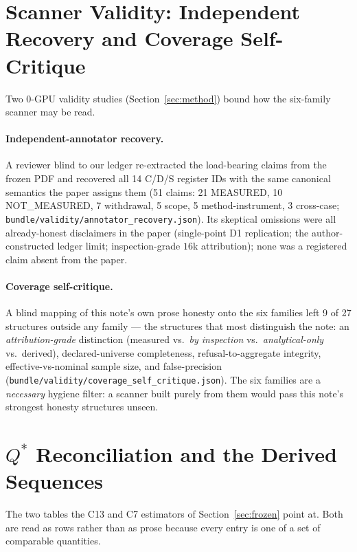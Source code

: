 \documentclass{article}
\newcommand{\zb}{\discretionary{}{}{}}
\newcommand{\code}[1]{\texttt{#1}}
\begin{document}
\section{Scanner Validity: Independent Recovery and Coverage Self-Critique}\label{app:validity}
Two 0-GPU validity studies (Section~\ref{sec:method}) bound how the six-family scanner may be
read.
\paragraph{Independent-annotator recovery.}
A reviewer blind to our ledger re-extracted the load-bearing claims from the frozen PDF and
recovered all 14 C/D/S register IDs with the same canonical semantics the paper assigns them
(51 claims: 21 MEASURED, 10 NOT\_MEASURED, 7 withdrawal, 5 scope, 5 method-instrument, 3
cross-case; \code{bundle/validity/\zb annotator\_recovery.json}). Its skeptical omissions
were all already-honest disclaimers in the paper (single-point D1 replication; the
author-constructed ledger limit; inspection-grade $16$k attribution); none was a registered
claim absent from the paper.
\paragraph{Coverage self-critique.}
A blind mapping of this note's own prose honesty onto the six families left 9 of 27 structures
outside any family --- the structures that most distinguish the note: an
\emph{attribution-grade} distinction (measured vs.\ \emph{by inspection} vs.\
\emph{analytical-only} vs.\ derived), declared-universe completeness, refusal-to-aggregate
integrity, effective-vs-nominal sample size, and false-precision
(\code{bundle/validity/\zb coverage\_self\_critique.json}). The six families are a
\emph{necessary} hygiene filter: a scanner built purely from them would pass this note's
strongest honesty structures unseen.

\section{\texorpdfstring{$Q^{*}$}{Q*} Reconciliation and the Derived Sequences}\label{app:derived}
The two tables the C13 and C7 estimators of Section~\ref{sec:frozen} point at. Both are read as
rows rather than as prose because every entry is one of a set of comparable quantities.
\end{document}
